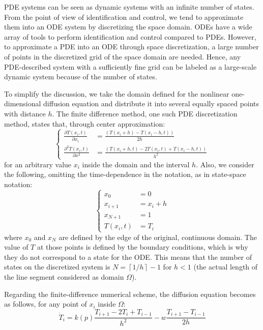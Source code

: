 PDE systems can be seen as dynamic systems with an infinite number of states.
%
From the point of view of identification and control, we tend to approximate them into an ODE system \cite{Thomee20011} by discretizing the space domain.
%
ODEs have a wide array of tools to perform identification and control compared to PDEs.
However, to approximate a PDE into an ODE through space discretization, a large number of points in the discretized grid of the space domain are needed.
%
Hence, any PDE-described system with a sufficiently fine grid can be labeled as a large-scale dynamic system because of the number of states.
%


To simplify the discussion, we take the domain defined for the nonlinear one-dimensional diffusion equation and distribute it into several equally spaced points with distance $h$. 
%
The finite difference method, one such PDE discretization method, states that, through center approximation:
\begin{equation}
\left \{ \begin{aligned}
 \frac{\partial T(x_i,t)}{\partial x_i} &= \frac{(T(x_i + h) - T(x_i-h,t))}{2h}\\
  \frac{\partial^{2} T(x_i,t)}{\partial x^2} &= \frac{(T(x_i + h,t) - 2T(x_i,t) + T(x_i - h,t))}{h^2}
\end{aligned}
\right .
\end{equation}
for an arbitrary value $x_i$ inside the domain and the interval $h$.
%
Also, we consider the following, omitting the time-dependence in the notation, as in state-space notation:
\begin{equation} \label{eqn:state_indexing}
\left \{ \begin{aligned}
  x_0 &= 0\\
   x_{i+1} &= x_i + h\\
  x_{N+1} &= 1\\
  T(x_i,t) &= T_i
\end{aligned} \right . 
\end{equation}
where $x_0$ and $x_N$ are defined by the edge of the original, continuous domain.
%
The value of $T$ at those points is defined by the boundary conditions, which is why they do not correspond to a state for the ODE.
%
This means that the number of states on the discretized system is $N = \left \lceil{1/h}\right \rceil - 1$ for $h < 1$ (the actual length of the line segment considered as domain $\Omega$).

Regarding the finite-difference numerical scheme, the diffusion equation becomes as follows, for any point of $x_i$ inside $\Omega$:
\begin{equation} \label{eqn:lineardiffusion_fdm1}
  \dot{T}_i =  k(p)\frac{T_{i+1} - 2T_i + T_{i-1}}{h^2} - w\frac{T_{i+1} - T_{i-1}}{2h} 
\end{equation}



